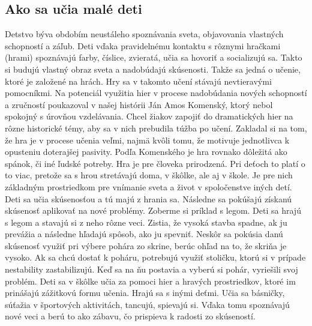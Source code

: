 \documentclass[10pt,twoside,slovak,a4paper]{article}
\begin{document}
\subsection{Ako sa učia malé deti} \label{nejaka:nieco}
	Detstvo býva obdobím neustáleho spoznávania sveta, objavovania vlastných schopností a záľub. Deti vďaka pravidelnému kontaktu s rôznymi hračkami (hrami) spoznávajú farby, číslice, zvieratá, učia sa hovoriť a socializujú sa. Takto si budujú vlastný obraz sveta a nadobúdajú skúsenosti. Takže sa jedná o učenie, ktoré je založené na hrách. Hry sa v takomto učení stávajú nevtieravými  pomocníkmi. Na potenciál využitia hier v procese nadobúdania nových schopností a zručností poukazoval v našej histórii Ján Amos Komenský, ktorý nebol spokojný s úrovňou vzdelávania. Chcel žiakov zapojiť do dramatických hier na rôzne historické témy, aby sa v nich prebudila túžba po učení. Zakladal si na tom, že hra je v procese učenia veľmi, najmä kvôli tomu, že motivuje jednotlivca k opusteniu doterajšej pasivity. Podľa Komenského je hra rovnako dôležitá ako spánok, či iné ľudské potreby. Hra je pre človeka prirodzená. Pri deťoch to platí o to viac, pretože sa s hrou stretávajú doma, v škôlke, ale aj v škole. Je pre nich základným prostriedkom pre vnímanie sveta a život v spoločenstve iných detí. Deti sa učia skúsenosťou a tú majú z hrania sa. Následne sa pokúšajú získanú skúsenosť aplikovať na nové problémy. Zoberme si príklad s legom. Deti sa hrajú s legom a stavajú si z neho rôzne veci. Zistia, že vysoká stavba spadne, ak ju prevážia a následne hľadajú spôsob, ako ju spevniť. Neskôr sa pokúsia danú skúsenosť využiť pri výbere pohára zo skrine, berúc ohľad na to, že skriňa je vysoko. Ak sa chcú dostať k poháru, potrebujú využiť stoličku, ktorú si v prípade nestability zastabilizujú. Keď sa na ňu postavia a vyberú si pohár, vyriešili svoj problém.  Deti sa v škôlke učia za pomoci hier a hravých prostriedkov, ktoré im prinášajú zážitkovú formu učenia. Hrajú sa s inými deťmi. Učia sa básničky, súťažia v športových aktivitách, tancujú,  spievajú si. Vďaka tomu spoznávajú nové veci a berú to ako zábavu, čo prispieva k radosti zo skúseností. 
\end{document}
